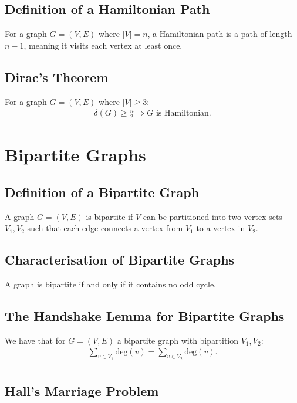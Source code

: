 \documentclass[a4paper, 12pt, twoside]{article}
\begin{document}
\subsection{Definition of a Hamiltonian Path}

For a graph $G = (V, E)$ where $|V| = n$, a Hamiltonian path is a path of
length $n - 1$, meaning it visits each vertex at least once.

\subsection{Dirac's Theorem}

For a graph $G = (V, E)$ where $|V| \geq 3$: \begin{gather*}
  \delta(G) \geq \frac{n}{2} \Rightarrow G \text{ is Hamiltonian.}
\end{gather*}

\vfill

\section{Bipartite Graphs}

\subsection{Definition of a Bipartite Graph}

A graph $G = (V, E)$ is bipartite if $V$ can be partitioned into
two vertex sets $V_1, V_2$ such that each edge connects a vertex
from $V_1$ to a vertex in $V_2$.

\subsection{Characterisation of Bipartite Graphs}

A graph is bipartite if and only if it contains no odd cycle.

\subsection{The Handshake Lemma for Bipartite Graphs}

We have that for $G = (V, E)$ a bipartite graph with bipartition
$V_1, V_2$: \begin{gather*}
  \sum_{v \in V_1} \text{deg}(v) = \sum_{v \in V_2} \text{deg}(v). \\
\end{gather*}

\subsection{Hall's Marriage Problem}
\end{document}
